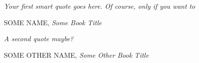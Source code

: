 \cleardoublepage
\thispagestyle{plain}

${}$

\vspace{8cm}

\begin{flushright}
	
	\begin{minipage}{0.73\textwidth}
		\textit{Your first smart quote goes here. Of course, only if you want to
		}
		\begin{flushright}
			\uppercase{Some name}, \textit{Some Book Title}
		\end{flushright}
	\end{minipage}

\vspace{3cm}
	
	
\begin{minipage}{0.73\textwidth}
	\textit{A second quote maybe?}
	\begin{flushright}
		\uppercase{Some other name}, \textit{Some Other Book Title}
	\end{flushright}
\end{minipage}
\end{flushright}